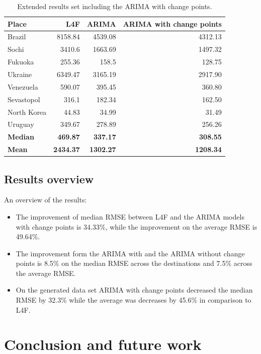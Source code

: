 \documentclass[minf,twoside,singlespacing,parskip,notimes,deptreport]{infthesis} %
\begin{document}
\begin{table}[h]
\begin{center}
\begin{tabular}{ l | r | r | r } 
Place & L4F & ARIMA & ARIMA with change points\\
\hline
Brazil	&	8158.84	&	4539.08	&	4312.13 \\
Sochi	&	3410.6	&	1663.69	&	1497.32 \\
Fukuoka	&	255.36	&	158.5	&	128.75 \\
Ukraine	&	6349.47	&	3165.19	&	2917.90 \\
Venezuela	&	590.07	&	395.45	&	360.80 \\
Sevastopol	&	316.1	&	182.34	&	162.50 \\
North Korea	&	44.83	&	34.99	&	31.49 \\
Uruguay	&	349.67	&	278.89	&	256.26 \\
\hline
\textbf{Median} & \textbf{469.87} & \textbf{337.17}  & \textbf{308.55}\\
\hline
\textbf{Mean} & \textbf{2434.37} & \textbf{1302.27} & \textbf{1208.34}\\
\end{tabular}
\end{center}
\caption{Extended results set including the ARIMA with change points.}
\label{comparison-results-v2}
\end{table}

\section{Results overview}
An overview of the results:
\begin{itemize}
\item The improvement of median RMSE between L4F and the ARIMA models with change points is 34.33\%, while the improvement on the average RMSE is 49.64\%. 
\item The improvement form the ARIMA with and the ARIMA without change points is 8.5\% on the median RMSE across the destinations and 7.5\% across the average RMSE. 
\item On the generated data set ARIMA with change points decreased the median RMSE by 32.3\% while the average was decreases by 45.6\% in comparison to L4F.
\end{itemize}


\chapter{Conclusion and future work}
\end{document}
